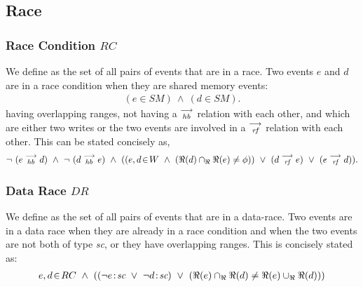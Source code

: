         
    \subsection{Race}
        
        \subsubsection{Race Condition $RC$} 
            We define  as the set of all pairs of events that are in a race. Two events $e$ and $d$ are in a race condition when they are shared memory events:
            \begin{align*}
                (e \in SM)\ \wedge\ (d \in SM).
            \end{align*}
            having overlapping ranges, not having a $\stackrel{\longrightarrow}{_\textit{hb}}$ relation with each other, and which are either two writes or the two events are involved in a $\stackrel{\longrightarrow}{_\textit{rf}}$ relation with each other. This can be stated concisely as,
            \begin{align*}
                \neg \ (\reln{e}{hb}{d})\ \wedge\ \neg \ (\reln{d}{hb}{e}) 
                \ \wedge \ 
                (
                (\event{e,d}{W}\  \wedge\ (\Re(d) \cap_{\Re} \Re(e) \neq \phi)) 
                    \  \vee\ (d \stck{_\textit{rf}} e)\ \vee\ (e \stck{_\textit{rf}} d)
                ).
            \end{align*}
                    
        \subsubsection{Data Race $DR$} 
            We define  as the set of all pairs of events that are in a data-race. Two events are in a data race when they are already in a race condition and when the two events are not both of type \textit{sc}, or they have overlapping ranges. This is concisely stated as:  
            \begin{align*}
                \event{e,d}{RC}  \ \wedge \ 
                ((\neg\et{e}{sc} \ \vee \ \neg\et{d}{sc}) \ \vee \ 
                (\Re(e) \cap_{\Re} \Re(d) \neq \Re(e) \cup_{\Re} \Re(d))) 
            \end{align*}
            
        
